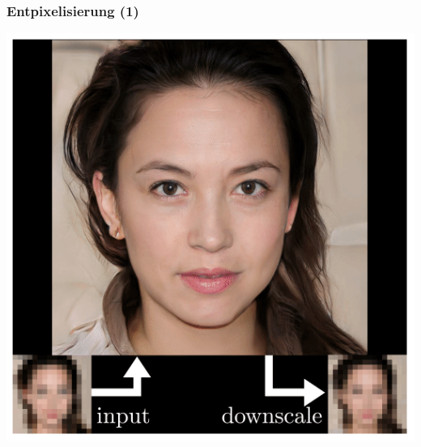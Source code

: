 \documentclass[aspectratio=169,x11names]{beamer}
\begin{document}
\begin{frame}
\frametitle{Entpixelisierung (1)}
\begin{center}
\includegraphics[height=0.7\paperheight,keepaspectratio]{images/example_depixelise} 
\end{center}
\end{frame}
\end{document}
